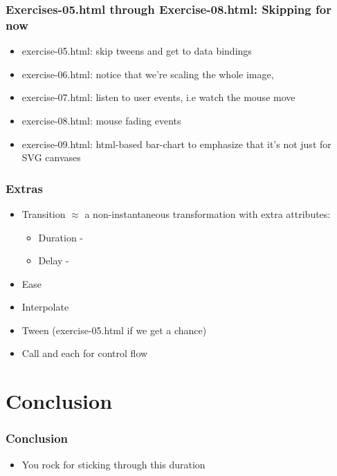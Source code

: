 \documentclass{beamer}
\begin{document}
\begin{frame}
    \frametitle{Exercises-05.html through Exercise-08.html: Skipping for now}
    \begin{itemize}
    \item exercise-05.html: skip tweens and get to data bindings
    \item exercise-06.html: notice that we're scaling the whole image,
    \item exercise-07.html: listen to user events, i.e watch the mouse move
    \item exercise-08.html: mouse fading events
    \item exercise-09.html: html-based bar-chart to emphasize that it's not just for SVG canvases
    \end{itemize}
\end{frame}

\begin{frame}
    \frametitle{Extras}
    \begin{itemize}
    \item Transition $\approx$ a non-instantaneous transformation with extra attributes:
        \begin{itemize}
        \item Duration - 
        \item Delay -  
        \end{itemize}
    \item Ease
    \item Interpolate
    \item Tween (exercise-05.html if we get a chance)
    \item Call and each for control flow 
    \end{itemize}
\end{frame}



\section{Conclusion}


\begin{frame}
    \frametitle{Conclusion}
    \begin{itemize}
    \item You rock for sticking through this duration
    \end{itemize}
\end{frame}
\end{document}
